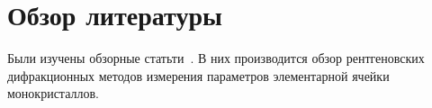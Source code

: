 \documentclass[bachelor]{disser}
\begin{document}
\section{Обзор литературы}

Были изучены обзорные статьти~\cite{Lider:2020,galdecka2006x}.
В них производится обзор рентгеновских дифракционных методов измерения параметров элементарной ячейки монокристаллов.




\end{document}
